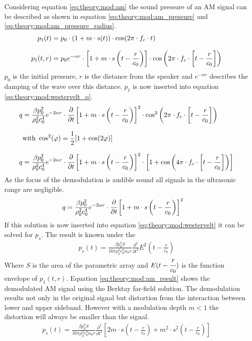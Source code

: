 Considering equation \ref{eq:theory:mod:am} the sound pressure of an AM signal can be described as shown in equation \ref{eq:theory:mod:am_pressure} and \ref{eq:theory:mod:am_pressure_radius}.
%
\begin{align}
  p_1(t) &= p_0 \cdot (1 + m \cdot s(t)) \cdot \cos (2 \pi \cdot f_c \cdot t)\label{eq:theory:mod:am_pressure}\pmath
  p_1(t, r) &= p_0 e^{- \alpha r} \cdot \left[1 + m \cdot s\left(t - \frac{r}{c_0}\right)\right] \cdot \cos \left(2 \pi \cdot f_c \cdot \left[t - \frac{r}{c_0}\right]\right)\label{eq:theory:mod:am_pressure_radius}
\end{align}
%
$p_0$ is the initial pressure, $r$ is the distance from the speaker and $e^{- \alpha r}$ describes the damping of the wave over this distance.\p
$p_1$ is now inserted into equation \ref{eq:theory:mod:westervelt_q}.
%
\begin{align}
  q &= \frac{\beta p_0^2}{\rho_0^2 c_0^4} e^{ - 2 \alpha r} \cdot \cfrac{\partial }{\partial t} \left[1 + m \cdot s\left(t - \frac{r}{c_0}\right)\right]^2 \cdot \cos^2 \left(2 \pi \cdot f_c \cdot \left[t - \frac{r}{c_0}\right]\right)\pmath
  &\mathrm{with~} \cos^2(\varphi) = \frac{1}{2} [1 + \cos (2 \varphi)]\pmath
  q &= \frac{\beta p_0^2}{\rho_0^2 c_0^4} e^{ - 2 \alpha r} \cdot \cfrac{\partial }{\partial t} \left[1 + m \cdot s\left(t - \frac{r}{c_0}\right)\right]^2 \cdot \left[1 + \cos \left(4 \pi \cdot f_c \cdot \left[t - \frac{r}{c_0}\right]\right)\right]
\end{align}
%
As the focus of the demodulation is audible sound all signals in the ultrasonic range are negligible.
%
\begin{align}
  q &= \frac{\beta p_0^2}{\rho_0^2 c_0^4} e^{ - 2 \alpha r} \cdot \cfrac{\partial }{\partial t} \left[1 + m \cdot s\left(t - \frac{r}{c_0}\right)\right]^2
\end{align}
%
If this solution is now inserted into equation \ref{eq:theory:mod:westervelt} it can be solved for $p_s$. The result is known under the \cite[Berktay far-field solution]{bai_analysis_2012}
%
\begin{align}
  p_s(t) = \frac{\beta p_0^2 S}{16 \pi \rho_0^2 c_0^4 \alpha_0 r} \frac{\partial^2}{\partial t^2} E^2(t - \frac{r}{c_0})\label{eq:theory:mod:berktay}
\end{align}
%
Where $S$ is the area of the parametric array and $E(t - \cfrac{r}{c_0})$ is the function envelope of $p_1(t,r)$.\p
Equation \ref{eq:theory:mod:am_result} shows the demodulated AM signal using the Berktay far-field solution. The demodulation results not only in the original signal but distortion from the interaction between lower and upper sideband. However with a modulation depth $m < 1$ the distortion will always be smaller than the signal.
%
\begin{align}
  p_s(t) = \frac{\beta p_0^2 S}{16 \pi \rho_0^2 c_0^4 \alpha_0 r} \frac{\partial^2}{\partial t^2} \left[ 2 m \cdot s\left(t - \frac{r}{c_0}\right) + m^2 \cdot s^2\left(t - \frac{r}{c_0}\right)\right]\label{eq:theory:mod:am_result}
\end{align}
%

